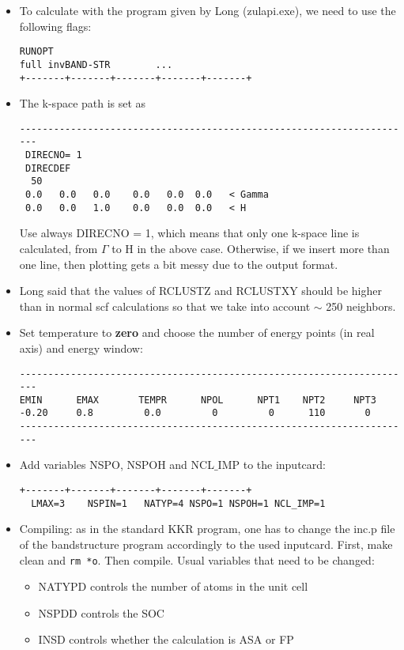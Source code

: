 \documentclass[a4paper,10pt,fullpage]{report}
\begin{document}
\begin{itemize}


\item To calculate with the program given by Long (zulapi.exe), we need to use the following 
flags:
\begin{verbatim}
RUNOPT
full invBAND-STR        ...
+-------+-------+-------+-------+-------+
\end{verbatim}
 
\item The k-space path is set as 
\begin{verbatim}
----------------------------------------------------------------------
 DIRECNO= 1
 DIRECDEF
  50
 0.0   0.0   0.0    0.0   0.0  0.0   < Gamma
 0.0   0.0   1.0    0.0   0.0  0.0   < H
\end{verbatim}
Use always DIRECNO = 1, which means that only one k-space line
is calculated, from $\Gamma$ to H in the above case. 
Otherwise, if we insert more than one line, then plotting
gets a bit messy due to the output format.

\item Long said that the values of RCLUSTZ and RCLUSTXY
should be higher than in normal scf calculations so that 
we take into account $\sim$ 250 neighbors.

\item Set temperature to \textbf{zero} and choose the number of energy points (in real axis)
and energy window:
\begin{verbatim}
----------------------------------------------------------------------
EMIN      EMAX       TEMPR      NPOL      NPT1    NPT2     NPT3
-0.20     0.8         0.0         0         0      110       0
----------------------------------------------------------------------
\end{verbatim}

\item Add variables NSPO, NSPOH and NCL$\_$IMP to the inputcard:
\begin{verbatim}
+-------+-------+-------+-------+-------+
  LMAX=3    NSPIN=1   NATYP=4 NSPO=1 NSPOH=1 NCL_IMP=1
\end{verbatim}

\item Compiling: as in the standard KKR program, one has to change the inc.p file 
of the bandstructure program accordingly to the used inputcard.
First, make clean and \verb|rm *o|. Then compile.
Usual variables that need to be changed:
\begin{itemize}
\item NATYPD controls the number of atoms in the unit cell
\item NSPDD controls the SOC 
\item INSD controls whether the calculation
is ASA or FP
\end{itemize}


\end{itemize}
\end{document}
